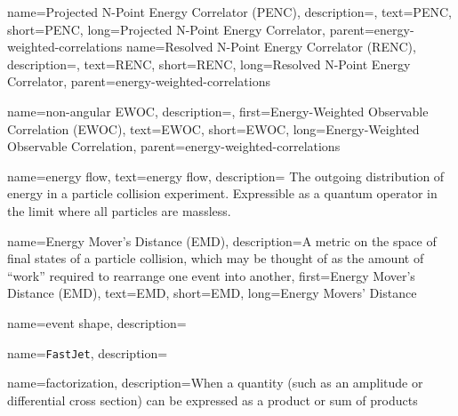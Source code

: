     {
        name=Projected N-Point Energy Correlator (PENC),
        description={},
        text={PENC},
        short={PENC},
        long={Projected N-Point Energy Correlator},
        parent=energy-weighted-correlations
    }
    {
        name=Resolved N-Point Energy Correlator (RENC),
        description={},
        text={RENC},
        short={RENC},
        long={Resolved N-Point Energy Correlator},
        parent=energy-weighted-correlations
    }

    {
        name=non-angular EWOC,
        description={},
        first={Energy-Weighted Observable Correlation (EWOC)},
        text={EWOC},
        short={EWOC},
        long={Energy-Weighted Observable Correlation},
        parent=energy-weighted-correlations
    }


{
  name=energy flow,
  text=energy flow,
  description={
      The outgoing distribution of energy in a particle collision experiment.
      Expressible as a quantum operator in the limit where all particles are massless.
  }
}


{
    name=Energy Mover's Distance (EMD),
    description={A metric on the space of final states of a particle collision, which may be thought of as the amount of ``work'' required to rearrange one event into another},
    first={Energy Mover's Distance (EMD)},
    text={EMD},
    short={EMD},
    long={Energy Movers' Distance}
}


{
  name=event shape,
  description={}
}



{
    name=\texttt{FastJet},
    description={}
}


{
  name=factorization,
  description={When a quantity (such as an amplitude or differential cross section) can be expressed as a product or sum of products}
}







